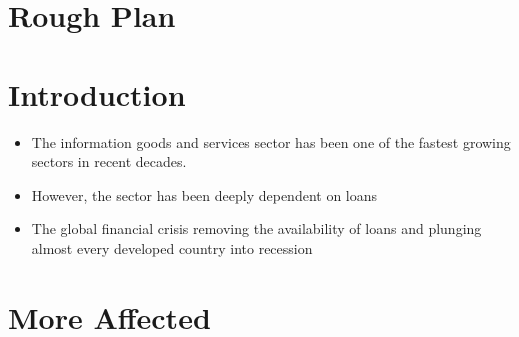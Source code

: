 \documentclass[10pt, a4paper]{article}
\begin{document}
\section*{Rough Plan}

\section*{Introduction}

\begin{itemize}

\item The information goods and services sector has been one of the fastest
growing sectors in recent decades.

\item However, the sector has been deeply dependent on loans

\item The global financial crisis removing the availability of loans and
plunging almost every developed country into recession

\end{itemize}

\section*{More Affected}
\end{document}
